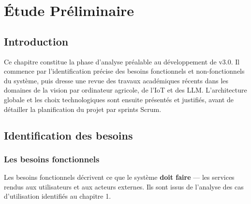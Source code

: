 \chapter{Étude Préliminaire}
\thispagestyle{fancy}

\section{Introduction}

Ce chapitre constitue la phase d'analyse préalable au développement de \farmAI{} v3.0.
Il commence par l'identification précise des besoins fonctionnels et non-fonctionnels
du système, puis dresse une revue des travaux académiques récents dans les domaines
de la vision par ordinateur agricole, de l'IoT et des LLM. L'architecture globale
et les choix technologiques sont ensuite présentés et justifiés, avant de détailler
la planification du projet par sprints Scrum.

\section{Identification des besoins}

\subsection{Les besoins fonctionnels}

Les besoins fonctionnels décrivent ce que le système \textbf{doit faire} — les
services rendus aux utilisateurs et aux acteurs externes. Ils sont issus de
l'analyse des cas d'utilisation identifiés au chapitre 1.

